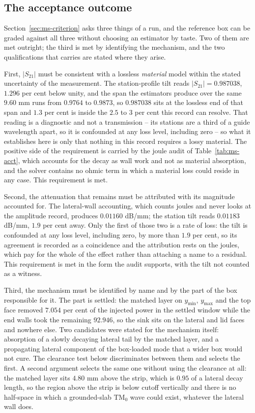 \subsection{The acceptance outcome}
\label{sec:msres-verdict}

Section~\ref{sec:ms-criterion} asks three things of a run, and the reference box can be graded against all three
without choosing an estimator by taste. Two of them are met outright; the third is met by identifying the
mechanism, and the two qualifications that carries are stated where they arise.

First, $|S_{21}|$ must be consistent with a lossless \emph{material} model within the stated uncertainty of the
measurement. The station-profile tilt reads $|S_{21}| = 0.987038$, $1.296$ per cent below unity, and the span
the estimators produce over the same $9.60$ mm runs from $0.9764$ to $0.9873$, so $0.987038$ sits at the lossless
end of that span and $1.3$ per cent is inside the $2.5$ to $3$ per cent this record can resolve. That reading is
a diagnostic and not a transmission -- its stations are a third of a guide wavelength apart, so it is confounded
at any
loss level, including zero -- so what it establishes here is only that nothing in this record requires a lossy
material. The positive side of the requirement is carried by the joule audit of Table~\ref{tab:ms-acct}, which
accounts for the decay as wall work and not as material absorption, and the solver contains no ohmic term in
which a material loss could reside in any case. This requirement is met.

Second, the attenuation that remains must be attributed with its magnitude accounted for. The lateral-wall
accounting, which counts joules and never looks at the amplitude record, produces $0.01160$ dB/mm; the station
tilt reads $0.01183$ dB/mm, $1.9$ per cent away. Only the first of those two is a rate of loss: the tilt is
confounded at any loss level, including zero, by more than $1.9$ per cent, so its agreement is recorded as a
coincidence and the attribution rests on the joules, which pay for the whole of the effect rather than attaching
a name to a residual. This requirement is met in the form the audit supports, with the tilt not counted as a
witness.

Third, the mechanism must be identified by name and by the part of the box responsible for it. The part is
settled: the matched layer on $y_{\min}$, $y_{\max}$ and the top face removed $7.054$ per cent of the injected
power in the settled window while the end walls took the remaining $92.946$, so the sink sits on the lateral and
lid faces and nowhere else. Two candidates were stated for the mechanism itself: absorption of a slowly decaying
lateral tail by the matched layer, and a propagating lateral component of the box-loaded mode that a wider box
would not cure. The clearance test below discriminates between them and selects the first. A second argument
selects the same one without using the clearance at all: the matched layer sits $4.80$ mm above the strip, which
is $0.95$ of a lateral decay length, so the region above the strip is below cutoff vertically and there is no
half-space in which a grounded-slab $\mathrm{TM}_0$ wave could exist, whatever the lateral wall does.
\label{par:msres-mechanism}

